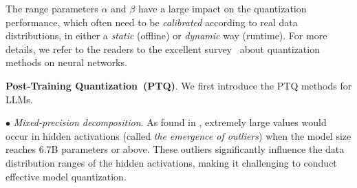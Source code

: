 {The range parameters  $\alpha$ and $\beta$ have a large impact on the quantization  performance}, which often need to be  \emph{calibrated} according to real data distributions, in either a \emph{static} (offline) or \emph{dynamic} way (runtime). For more details, we refer to the readers to the excellent  survey~\cite{Gholami-CoRR-2022-A} about quantization methods on neural networks.  

\textbf{Post-Training Quantization~(PTQ)}. We first introduce the PTQ methods for LLMs. 

$\bullet$ \emph{Mixed-precision decomposition}. As found in \cite{Dettmers-arxiv-2022-LLM}, {extremely} large values would occur in hidden activations (called \emph{the emergence of outliers}) when the model size reaches  6.7B parameters or above. These outliers significantly influence the data distribution ranges of the hidden activations, making it challenging to conduct effective model quantization. 

